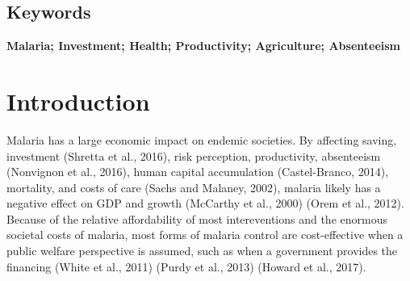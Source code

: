 \documentclass[]{article}
\begin{document}
\vspace{20mm}

\noindent{}

\vfill
\null

\subsection*{Keywords}

\textbf{Malaria; Investment; Health; Productivity; Agriculture; Absenteeism}

\vspace{3mm}

\newpage

\section{Introduction}\label{introduction}

Malaria has a large economic impact on endemic societies. By affecting
saving, investment (Shretta et al., 2016), risk perception,
productivity, absenteeism (Nonvignon et al., 2016), human capital
accumulation (Castel-Branco, 2014), mortality, and costs of care (Sachs
and Malaney, 2002), malaria likely has a negative effect on GDP and
growth (McCarthy et al., 2000) (Orem et al., 2012). Because of the
relative affordability of most intereventions and the enormous societal
costs of malaria, most forms of malaria control are cost-effective when
a public welfare perspective is assumed, such as when a government
provides the financing (White et al., 2011) (Purdy et al., 2013) (Howard
et al., 2017).
\end{document}
